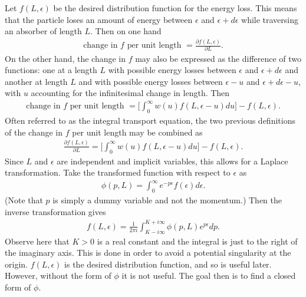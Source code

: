 Let $f(L,\epsilon)$ be the desired distribution function for the energy loss. This means that the particle loses an amount of energy between $\epsilon$ and $\epsilon+d\epsilon$ while traversing an absorber of length $L$. Then on one hand
\begin{align*}
\text{change in $f$ per unit length }=\frac{\partial f(L,\epsilon)}{\partial L}.
\end{align*}
On the other hand, the change in $f$ may also be expressed as the difference of two functions: one at a length $L$ with possible energy losses between $\epsilon$ and $\epsilon+d\epsilon$ and another at length $L$ and with possible energy losses between $\epsilon-u$ and $\epsilon+d\epsilon-u$, with $u$ accounting for the infinitesimal change in length. Then
\begin{align*}
\text{change in $f$ per unit length }=\Bigg [\int_0 ^\infty w(u) f(L,\epsilon-u) du \Bigg] - f(L,\epsilon).
\end{align*}
Often referred to as the integral transport equation, the two previous definitions of the change in $f$ per unit length may be combined as
\begin{align}\label{eqn:Landau1}
\frac{\partial f(L,\epsilon)}{\partial L} = \Bigg [\int_0 ^\infty w(u) f(L,\epsilon-u) du \Bigg] - f(L,\epsilon).
\end{align}
Since $L$ and $\epsilon$ are independent and implicit variables, this allows for a Laplace transformation. Take the transformed function with respect to $\epsilon$ as 
\begin{align*}
\phi(p,L)=\int_0 ^\infty e^{-p \epsilon} f(\epsilon) d\epsilon.
\end{align*}
(Note that $p$ is simply a dummy variable and not the momentum.)
%
Then the inverse transformation gives
\begin{align} \label{eqn:LandauInverseTransformation}
f(L,\epsilon)=\frac{1}{2\pi i} \int_{K-i \infty} ^{K+i\infty} \phi(p,L) e^{p\epsilon} dp.
\end{align}
Observe here that $K>0$ is a real constant and the integral is just to the right of the imaginary axis. This is done in order to avoid a potential singularity at the origin. $f(L,\epsilon)$ is the desired distribution function, and so is useful later. However, without the form of $\phi$ it is not useful. The goal then is to find a closed form of $\phi$.

